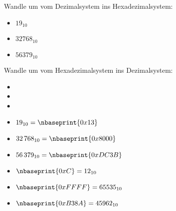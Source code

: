 \begin{question}
	\begin{tasks}
		\task Wandle um vom Dezimalsystem ins Hexadezimalsystem:
		\begin{itemize}
			\item $19_{10}$
			\item $\num{32768}_{10}$
			\item $\num{56379}_{10}$
		\end{itemize}
		\task Wandle um vom Hexadezimalsystem ins Dezimalsystem:
		\begin{itemize}
			\item {}
			\item {}
			\item {}
		\end{itemize}
	\end{tasks}	
\end{question}
\begin{solution}
	\begin{tasks}
		\task 
		\begin{itemize}
			\item $19_{10} = \nbaseprint{0x13}$
			\item $\num{32768}_{10} = \nbaseprint{0x8000}$
			\item $\num{56379}_{10} = \nbaseprint{0xDC3B}$
		\end{itemize}
		\task
		\begin{itemize}
			\item $\nbaseprint{0xC} = 12_{10}$
			\item $\nbaseprint{0xFFFF} = 65535_{10}$
			\item $\nbaseprint{0xB38A} = 45962_{10}$
		\end{itemize}
	\end{tasks}	
\end{solution}


